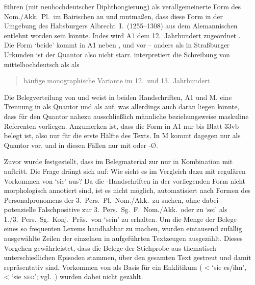 \citet[396--397]{ksw2} führen  (mit
neuhochdeutscher Diphthongierung) als ver\-all\-gemeinerte Form des Nom./Akk.\ Pl.\ im
Bairischen an und mutmaßen, dass diese Form in der Umgebung des
Habsburgers Albrecht~I.\ (1255--1308) aus dem Alemannischen
entlehnt worden sein könnte. Indes wird A1 dem 12.~Jahrhundert zugeordnet
\autocite{kcdigital,wolf:kckat}. Die Form  `beide' kommt in A1 neben
,  und  vor -- anders als in Straßburger
Urkunden ist der Quantor also nicht starr. \citeauthor{wiesinger2001}
interpretiert die Schreibung von mittelhochdeutsch
 als  als \blockcquote[103]{wiesinger2001}{häufige
mono\-graphische Variante \textelp{} im 12.\ und 13.~Jahrhundert}.

Die Belegverteilung von  und
 weist in beiden Handschriften, A1 und M, eine Trennung in
 als Quantor und  als  auf, was
allerdings auch daran liegen könnte, dass für den Quantor nahezu ausschließlich
männliche beziehungsweise maskuline Referenten vorliegen. Anzumerken ist, dass
die Form  in A1 nur bis Blatt 33vb belegt ist, also nur für die
erste Hälfte des Texts. In M kommt  dagegen nur als Quantor vor, und
in diesen Fällen nur mit  oder -Ø.

Zuvor wurde festgestellt, dass im Belegmaterial zur \KC{} nur
 in Kombination mit  auftritt. Die Frage drängt sich
auf: Wie sieht es im Vergleich dazu mit regulären Vorkommen von `sie' aus? Da
die \KC{}-Hand\-schrif\-ten in der vorliegenden Form nicht morphologisch
annotiert sind, ist es nicht möglich, automatisiert nach Formen des
Personal\-pronomens der 3.~Pers.\ Pl.\ Nom./Akk.\ zu
suchen, ohne dabei potenzielle Falschpositive zur 3.~Pers.\
Sg.~F.\ Nom./Akk.\ oder zu  `sei' als 1./3.~Pers.\ Sg.\ Konj.\ Präs.\
von  `sein' zu erhalten. Um die Menge der Belege eines so frequenten
Lexems handhabbar zu machen, wurden eintausend zufällig ausgewählte Zeilen der
einzelnen in \tabref{tab:sieprn} aufgeführten Textzeugen ausgezählt. Dieses
Vorgehen gewährleistet, dass die Belege der Stichprobe aus thematisch
unterschiedlichen Episoden stammen, über den gesamten Text gestreut und damit
repräsentativ sind. Vorkommen von \norm{si} als Basis für ein Enklitikum
(\norm{siȥ/-n} < \norm{si eȥ/in} `sie es/ihn', \norm{sine} < \norm{si ne} `sie
\textsc{neg}'; vgl.~\cites[384--387]{ksw2}[31]{paul2007}) wurden dabei nicht
gezählt.

